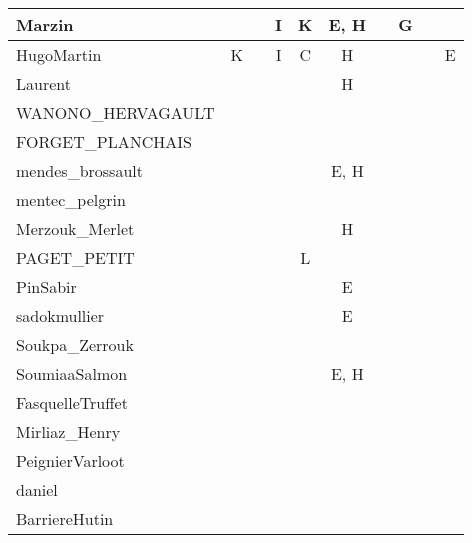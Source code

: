 \documentclass[a4paper]{article}
\begin{document}
\begin{table}[h!]
\begin{tabular}{|l|c|c|c|c|c|c|c|c|c|}
    Marzin                  &       &       & I     & K     & E, H  &       & G     &       &       \\ \hline
    HugoMartin              & K     &       & I     & C     & H     &       &       &       & E     \\ \hline
    Laurent                 &       &       &       &       & H     &       &       &       &       \\ \hline
    WANONO\_HERVAGAULT      &       &       &       &       &       &       &       &       &       \\ \hline
    FORGET\_PLANCHAIS       &       &       &       &       &       &       &       &       &       \\ \hline
    mendes\_brossault       &       &       &       &       & E, H  &       &       &       &       \\ \hline
    mentec\_pelgrin         &       &       &       &       &       &       &       &       &       \\ \hline
    Merzouk\_Merlet         &       &       &       &       & H     &       &       &       &       \\ \hline
    PAGET\_PETIT            &       &       &       & L     &       &       &       &       &       \\ \hline
    PinSabir                &       &       &       &       & E     &       &       &       &       \\ \hline
    sadokmullier            &       &       &       &       & E     &       &       &       &       \\ \hline
    Soukpa\_Zerrouk         &       &       &       &       &       &       &       &       &       \\ \hline
    SoumiaaSalmon           &       &       &       &       & E, H  &       &       &       &       \\ \hline
    FasquelleTruffet        &       &       &       &       &       &       &       &       &       \\ \hline
    Mirliaz\_Henry          &       &       &       &       &       &       &       &       &       \\ \hline
    PeignierVarloot         &       &       &       &       &       &       &       &       &       \\ \hline
    daniel                  &       &       &       &       &       &       &       &       &       \\ \hline
    BarriereHutin           &       &       &       &       &       &       &       &       &       \\ \hline

\end{tabular}
\end{table}
\end{document}
